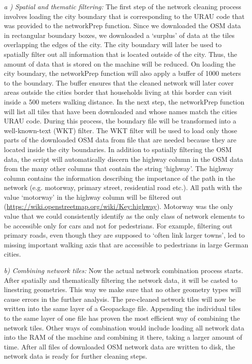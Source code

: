 \documentclass[10pt]{article}
\begin{document}
\textit{a ) Spatial and thematic filtering:} The first step of the network cleaning process involves loading the city boundary that is corresponding to the URAU code that was provided to the networkPrep function. 
Since we downloaded the OSM data in rectangular boundary boxes, we downloaded a ‘surplus’ of data at the tiles overlapping the edges of the city.
The city boundary will later be used to spatially filter out all information that is located outside of the city.
Thus, the amount of data that is stored on the machine will be reduced.
On loading the city boundary, the networkPrep function will also apply a buffer of 1000 meters to the boundary.
The buffer ensures that the cleaned network will later cover areas outside the cities border that households living at this border can visit inside a 500 meters walking distance.
In the next step, the networkPrep function will list all tiles that have been downloaded and whose names match the cities URAU code.
During this process, the boundary file will be transformed into a well-known-text (WKT) filter.
The WKT filter will be used to load only those parts of the downloaded OSM data from file that are needed because they are located inside the city boundaries.
In addition to spatially filtering the OSM data, the script will automatically discern the highway column in the OSM data from the many other columns that contain the string ‘highway’.
The highway column contains the information describing the importance of the path in the network (e.g. motorway, primary street, residential road etc.).
All path with the value ‘motorway’ in the highway column will be filtered out (\url{https://wiki.openstreetmap.org/wiki/Key:highway}).
Motorway was the only value that we could consistently identify as the only class of network elements to be accessible only for cars and not for pedestrians. 
For example, filtering out primary roads, even though they are supposed to ‘often link larger towns’, led to missing important walking axis that are accessible to pedestrians in large German cities.

\textit{b) Combining network tiles:} Now the actual network combination process starts. 
After spatially and thematically filtering the network data, it will be casted to linestring geometries.
This way we make sure that no other geometry types will cause errors in the further analysis.
The pre-cleaned network tiles will now be written into the same layer of a Geopackage file.
Appending the individual tiles to the same layer of one file has proven the most efficient way of combining the network tiles.
Other ways of combination would include loading all network data into the RAM of the machine and combining it there, taking a larger amount of time.
After all files of downloaded OSM network data are written to disk, the network data is ready for further cleaning steps.
\end{document}
